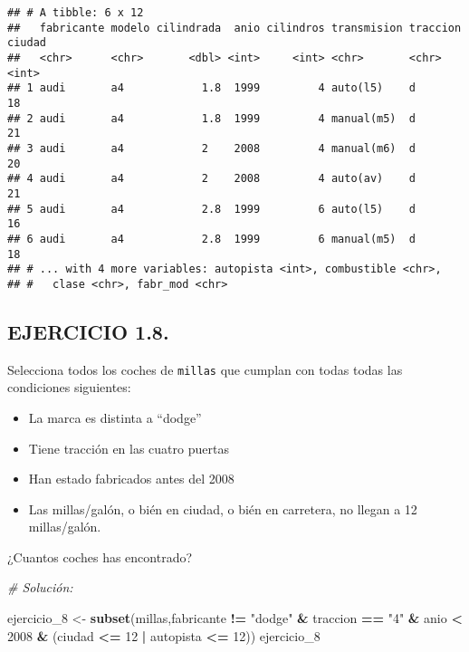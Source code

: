 \documentclass[]{article}
\newenvironment{Shaded}{\begin{snugshade}}{\end{snugshade}}
\newcommand{\CommentTok}[1]{\textcolor[rgb]{0.56,0.35,0.01}{\textit{#1}}}
\newcommand{\DecValTok}[1]{\textcolor[rgb]{0.00,0.00,0.81}{#1}}
\newcommand{\KeywordTok}[1]{\textcolor[rgb]{0.13,0.29,0.53}{\textbf{#1}}}
\newcommand{\NormalTok}[1]{#1}
\newcommand{\OperatorTok}[1]{\textcolor[rgb]{0.81,0.36,0.00}{\textbf{#1}}}
\newcommand{\StringTok}[1]{\textcolor[rgb]{0.31,0.60,0.02}{#1}}
\providecommand{\tightlist}{%
  \setlength{\itemsep}{0pt}\setlength{\parskip}{0pt}}
\begin{document}
\begin{verbatim}
## # A tibble: 6 x 12
##   fabricante modelo cilindrada  anio cilindros transmision traccion ciudad
##   <chr>      <chr>       <dbl> <int>     <int> <chr>       <chr>     <int>
## 1 audi       a4            1.8  1999         4 auto(l5)    d            18
## 2 audi       a4            1.8  1999         4 manual(m5)  d            21
## 3 audi       a4            2    2008         4 manual(m6)  d            20
## 4 audi       a4            2    2008         4 auto(av)    d            21
## 5 audi       a4            2.8  1999         6 auto(l5)    d            16
## 6 audi       a4            2.8  1999         6 manual(m5)  d            18
## # ... with 4 more variables: autopista <int>, combustible <chr>,
## #   clase <chr>, fabr_mod <chr>
\end{verbatim}

\hypertarget{ejercicio-1.8.}{%
\subsection{EJERCICIO 1.8.}\label{ejercicio-1.8.}}

Selecciona todos los coches de \texttt{millas} que cumplan con todas
todas las condiciones siguientes:

\begin{itemize}
\tightlist
\item
  La marca es distinta a ``dodge''
\item
  Tiene tracción en las cuatro puertas
\item
  Han estado fabricados antes del 2008
\item
  Las millas/galón, o bién en ciudad, o bién en carretera, no llegan a
  12 millas/galón.
\end{itemize}

¿Cuantos coches has encontrado?

\begin{Shaded}
\begin{Highlighting}[]
\CommentTok{# Solución:}

\NormalTok{ejercicio_}\DecValTok{8}\NormalTok{ <-}\StringTok{ }\KeywordTok{subset}\NormalTok{(millas,fabricante }\OperatorTok{!=}\StringTok{ "dodge"} \OperatorTok{&}\StringTok{ }\NormalTok{traccion }\OperatorTok{==}\StringTok{ "4"} \OperatorTok{&}\StringTok{ }\NormalTok{anio }\OperatorTok{<}\StringTok{ }\DecValTok{2008} \OperatorTok{&}\StringTok{ }\NormalTok{(ciudad }\OperatorTok{<=}\StringTok{ }\DecValTok{12} \OperatorTok{|}\StringTok{ }\NormalTok{autopista }\OperatorTok{<=}\StringTok{ }\DecValTok{12}\NormalTok{))}
\NormalTok{ejercicio_}\DecValTok{8}
\end{Highlighting}
\end{Shaded}
\end{document}
